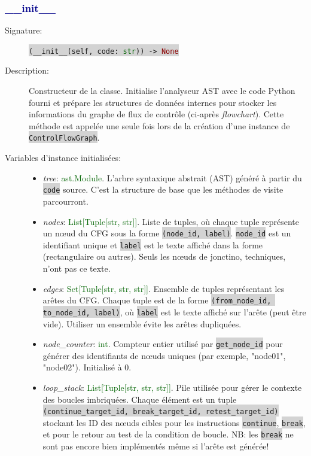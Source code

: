 \documentclass[11pt,a4paper]{article}
\newcommand{\code}[1]{\colorbox{lightgray}{\texttt{\small #1}}}
\newcommand{\var}[1]{\textit{#1}}
\newcommand{\vartype}[1]{\textcolor{darkgreen}{#1}}
\newcommand{\methodname}[1]{\textbf{\textcolor{darkblue}{#1}}}
\newcommand{\param}[1]{\code{#1}}
\newcommand{\rettype}[1]{\textcolor{darkred}{#1}}
\begin{document}
\subsubsection*{\methodname{\_\_init\_\_}}
\begin{description}
    \item[Signature:] \code{(\_\_init\_\_(self, code: \vartype{str})) -> \rettype{None}}
    \item[Description:] Constructeur de la classe. Initialise l'analyseur AST avec le code Python fourni et prépare les structures de données internes pour stocker les informations du graphe de flux de contrôle (ci-après \textit{flowchart}). Cette méthode est appelée une seule fois lors de la création d'une instance de \code{ControlFlowGraph}.
    \item[Variables d'instance initialisées:]
    \begin{itemize}
        \item \var{tree}: \vartype{ast.Module}. L'arbre syntaxique abstrait (AST) généré à partir du \param{code} source. C'est la structure de base que les méthodes de visite parcourront.
        
        \item \var{nodes}: \vartype{List[Tuple[str, str]]}. Liste de tuples, où chaque tuple représente un nœud du CFG sous la forme \code{(node\_id, label)}. \code{node\_id} est un identifiant unique et \code{label} est le texte affiché dans la forme (rectangulaire ou autres). Seuls les nœuds de jonctino, techniques, n'ont pas ce texte.
        
        \item \var{edges}: \vartype{Set[Tuple[str, str, str]]}. Ensemble de tuples représentant les arêtes du CFG. Chaque tuple est de la forme \code{(from\_node\_id, to\_node\_id, label)}, où \code{label} est le texte affiché sur l'arête (peut être vide). Utiliser un ensemble évite les arêtes dupliquées.
        
        \item \var{node\_counter}: \vartype{int}. Compteur entier utilisé par \code{get\_node\_id} pour générer des identifiants de nœuds uniques (par exemple, "node01", "node02"). Initialisé à 0.
        
        \item \var{loop\_stack}: \vartype{List[Tuple[str, str, str]]}. Pile utilisée pour gérer le contexte des boucles imbriquées. Chaque élément est un tuple \code{(continue\_target\_id, break\_target\_id, retest\_target\_id)} stockant les ID des nœuds cibles pour les instructions \code{continue}, \code{break}, et pour le retour au test de la condition de boucle. NB: les \code{break} ne sont pas encore bien implémentés même si l'arête est générée!
        

\end{itemize}
\end{description}
\end{document}
